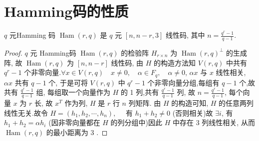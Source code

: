 \section{Hamming码的性质}
\begin{theorem}
 $ q $ 元Hamming 码 $ \operatorname{Ham}(r, q) $ 是 $ q $ 元 $ [n, n-r, 3] $ 线性码, 其中 $ n=\frac{q^{r}-1}{q-1} $.
\end{theorem}
\begin{proof}
$ q $ 元 Hamming码 $ \operatorname{Ham}(r, q) $ 的检验阵 $ H_{r \times n} $ 为 $ \operatorname{Ham}(r, q)^{\perp} $ 的生成阵, 故 $ \operatorname{Ham}(r, q) $ 为 $ [n, n-r] $ 线性码, 由 $ H $ 的构造方法知 $ V(r, q) $ 中共有 $ q^{r}-1 $ 个非零向量.$\forall x \in V(r, q) \quad x \neq 0, \quad \alpha \in F_{q}, \quad \alpha \neq 0$,
$ \alpha x$ 与 $ x $ 线性相关, $ \alpha x $ 共有 $ q-1 $ 个, 于是可将 $ V(r, q) $ 中 $ q^{r}-1 $ 个非零向量分组,每组有 $ q-1 $ 个,故共有 $ \frac{q^{r}-1}{q-1} $ 组, 每组取一个向量作为 $ H $ 的 1 列,共有 $ \frac{q^{r}-1}{q-1} $ 列, 故 $ n=\frac{q^{r}-1}{q-1} $, 每个向量 $ x $ 为 $ r $ 长, 故 $ x^{T} $ 作为列, $ H $ 是 $ r $ 行 $ n $ 列矩阵.
由 $ H $ 的构造可知, $ H $ 的任意两列线性无关.故令 $ H=\left(h_{1}, h_{2}, \cdots, h_{n}\right), \quad $ 有 $ h_{1}+h_{2} \neq 0 $ (否则相关)故 $ \exists i $, 有 $ h_{1}+h_{2}=\alpha h_{i} $ (因非零向量都在 $ H $ 的列分组中)因此 $ H $ 中存在 3 列线性相关, 从而 $ \operatorname{Ham}(r, q) $ 的最小距离为 3 .
\end{proof}

